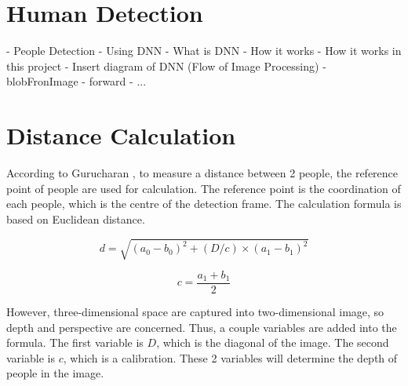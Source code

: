 
    \section{Human Detection}
        -	People Detection
            - Using DNN
            - What is DNN
            - How it works
            - How it works in this project
                - Insert diagram of DNN (Flow of Image Processing)
                    - blobFronImage
                    - forward
                    - ...

    \section{Distance Calculation}
        According to Gurucharan \cite{SOCIAL-DISTANCING-DETECTION}, to measure a distance between 2 people, the reference point of people are used for calculation.
        The reference point is the coordination of each people, which is the centre of the detection frame.
        The calculation formula is based on Euclidean distance.

        \begin{equation*}
            d = \sqrt{(a_{0}-b_{0})^{2}+(D/c)\times(a_{1}-b_{1})^{2}}
        \end{equation*}

        \begin{equation*}
            c = \frac{a_{1}+b_{1}}{2}
        \end{equation*}

        However, three-dimensional space are captured into two-dimensional image, so depth and perspective are concerned.
        Thus, a couple variables are added into the formula.
        The first variable is $D$, which is the diagonal of the image.
        The second variable is $c$, which is a calibration.
        These 2 variables will determine the depth of people in the image.

